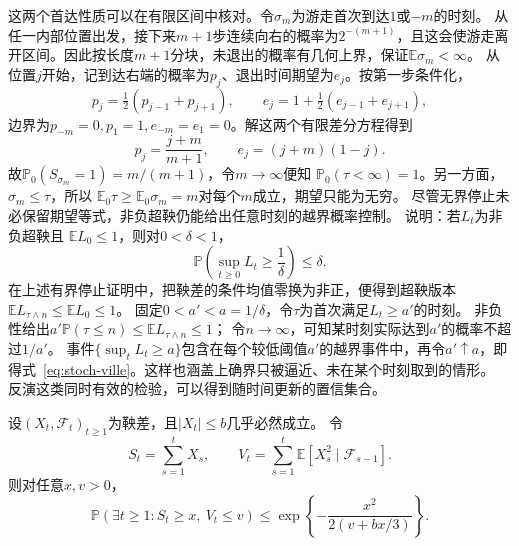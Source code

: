这两个首达性质可以在有限区间中核对。令\(\sigma_m\)为游走首次到达\(1\)或\(-m\)的时刻。
从任一内部位置出发，接下来\(m+1\)步连续向右的概率为\(2^{-(m+1)}\)，且这会使游走离开区间。因此按长度\(m+1\)分块，未退出的概率有几何上界，保证\(\mathbb E\sigma_m<\infty\)。
从位置\(j\)开始，记到达右端的概率为\(p_j\)、退出时间期望为\(e_j\)。按第一步条件化，
\[
 p_j=\tfrac12(p_{j-1}+p_{j+1}),\qquad
 e_j=1+\tfrac12(e_{j-1}+e_{j+1}),
\]
边界为\(p_{-m}=0,p_1=1,e_{-m}=e_1=0\)。解这两个有限差分方程得到
\[
 p_j=\frac{j+m}{m+1},\qquad e_j=(j+m)(1-j).
\]
故\(\mathbb P_0(S_{\sigma_m}=1)=m/(m+1)\)，令\(m\to\infty\)便知
\(\mathbb P_0(\tau<\infty)=1\)。另一方面，\(\sigma_m\leq\tau\)，所以
\(\mathbb E_0\tau\geq\mathbb E_0\sigma_m=m\)对每个\(m\)成立，期望只能为无穷。
尽管无界停止未必保留期望等式，非负超鞅仍能给出任意时刻的越界概率控制。
说明：若$L_t$为非负超鞅且
$\mathbb{E}L_0\leq1$，则对\(0<\delta<1\)，
\begin{equation}
  \mathbb{P}\left(\sup_{t\geq0}L_t\geq\frac1\delta\right)
  \leq\delta.
  \label{eq:stoch-ville}
\end{equation}
在上述有界停止证明中，把鞅差的条件均值零换为非正，便得到超鞅版本
\(\mathbb E L_{\tau\wedge n}\leq\mathbb E L_0\leq1\)。
固定\(0<a'<a=1/\delta\)，令\(\tau\)为首次满足\(L_t\geq a'\)的时刻。
非负性给出\(a'\mathbb P(\tau\leq n)\leq\mathbb E L_{\tau\wedge n}\leq1\)；
令\(n\to\infty\)，可知某时刻实际达到\(a'\)的概率不超过\(1/a'\)。
事件\(\{\sup_tL_t\geq a\}\)包含在每个较低阈值\(a'\)的越界事件中，再令\(a'\uparrow a\)，即得式~\eqref{eq:stoch-ville}。这样也涵盖上确界只被逼近、未在某个时刻取到的情形。
反演这类同时有效的检验，可以得到随时间更新的置信集合。
\begin{theorem}[标量Freedman不等式]
  \label{thm:stoch-freedman}
  设$(X_t,\mathcal{F}_t)_{t\geq1}$为鞅差，且$|X_t|\leq b$几乎必然成立。
  令
  \[
    S_t=\sum_{s=1}^{t}X_s,\qquad
    V_t=\sum_{s=1}^{t}
      \mathbb{E}[X_s^2\mid\mathcal{F}_{s-1}].
  \]
  则对任意$x,v>0$，
  \begin{equation}
    \mathbb{P}\left(\exists t\geq1:S_t\geq x,\ V_t\leq v\right)
    \leq\exp\left\{
      -\frac{x^2}{2(v+bx/3)}
    \right\}.
    \label{eq:stoch-freedman}
  \end{equation}
\end{theorem}


